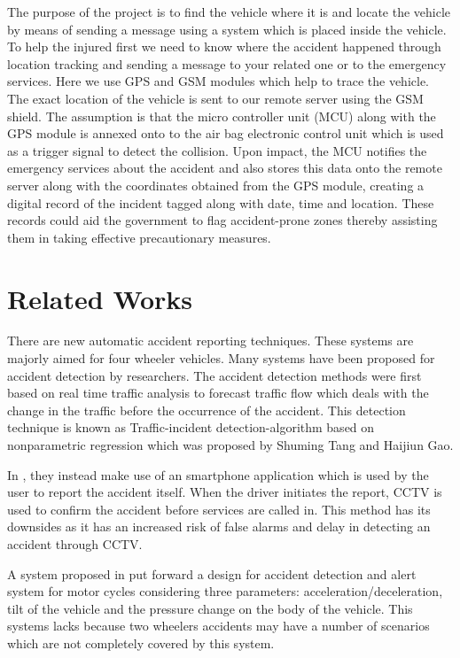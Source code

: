 \documentclass{llncs}
\begin{document}
The purpose of the project is to find the vehicle where it is and locate the vehicle by means of sending a message using a system which is placed inside the vehicle. To help the injured first we need to know where the accident happened through location tracking and sending a message to your related one or to the emergency services. Here we use GPS and GSM modules which help to trace the vehicle. The exact location of the vehicle is sent to our remote server using the GSM shield. The assumption is that the micro controller unit (MCU) along with the GPS module is annexed onto to the air bag electronic control unit which is used as a trigger signal to detect the collision. Upon impact, the MCU notifies the emergency services about the accident and also stores this data onto the remote server along with the coordinates obtained from the GPS module, creating a digital record of the incident tagged along with date, time and location. These records could aid the government to flag accident-prone zones thereby assisting them in taking effective precautionary measures. 

\section{Related Works}
There are new automatic accident reporting techniques. These systems are majorly aimed for four wheeler vehicles. Many systems have been proposed for accident detection by researchers. The accident detection methods were first based on real time traffic analysis to forecast traffic flow which deals with the change in the traffic before the occurrence of the accident. This detection technique is known as Traffic-incident detection-algorithm based on nonparametric regression which was proposed by Shuming Tang and Haijiun Gao.

In \cite{chuan}, they instead make use of an smartphone application which is used by the user to report the accident itself. When the driver initiates the report, CCTV is used to confirm the accident before services are called in. This method has its downsides as it has an increased risk of false alarms and delay in detecting an accident through CCTV.

A system proposed in \cite{bin} put forward a design for accident detection and alert system for motor cycles considering three parameters: acceleration/deceleration, tilt of the vehicle and the pressure change on the body of the vehicle. This systems lacks because two wheelers accidents may have a number of scenarios which are not completely covered by this system.
\end{document}
